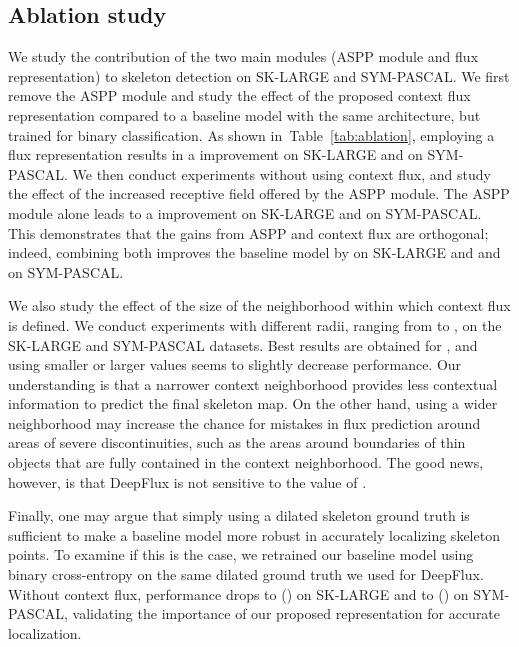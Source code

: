 \documentclass[10pt,twocolumn,letterpaper]{article}
\newcommand{\reftab}[1]{Table~\ref{#1}}
\begin{document}
{\subsection{Ablation study} \label{sec:ablation}
We study the contribution of the two main modules (ASPP module and flux representation)  to skeleton detection on SK-LARGE and SYM-PASCAL. We first remove the ASPP module and study the effect of the proposed context flux representation compared to a baseline model with the same architecture, but trained for binary classification.
As shown in~\reftab{tab:ablation}, employing a flux representation results in a   improvement on SK-LARGE and  on SYM-PASCAL.
We then conduct experiments without using context flux, and study the effect of the increased receptive field offered by the ASPP module.
The ASPP module alone leads to a  improvement on SK-LARGE and  on SYM-PASCAL.
This demonstrates that the gains from ASPP and context flux are orthogonal; indeed, combining both improves the baseline model by  on SK-LARGE and and   on SYM-PASCAL.

We also study the effect of the size of the neighborhood within which context flux is defined.
We conduct experiments with different radii, ranging from  to , on the SK-LARGE and SYM-PASCAL datasets.
Best results are obtained for , and using smaller or larger values seems to slightly decrease performance.
Our understanding is that a narrower context neighborhood provides less contextual information to predict the final skeleton map.
On the other hand, using a wider neighborhood may increase the chance for mistakes in flux prediction around areas of severe discontinuities, such as the areas around boundaries of thin objects that are fully contained in the context neighborhood.
The good news, however, is that DeepFlux is not sensitive to the value of .

Finally, one may argue that simply using a dilated skeleton ground truth is sufficient to make a baseline model more robust in accurately localizing skeleton points.
To examine if this is the case, we retrained our baseline model using binary cross-entropy on the same dilated ground truth we used for DeepFlux.
Without context flux, performance drops to  (\textcolor{red}{}) on SK-LARGE and to  (\textcolor{red}{}) on SYM-PASCAL, validating the importance of our proposed representation for accurate localization.


}
\end{document}
